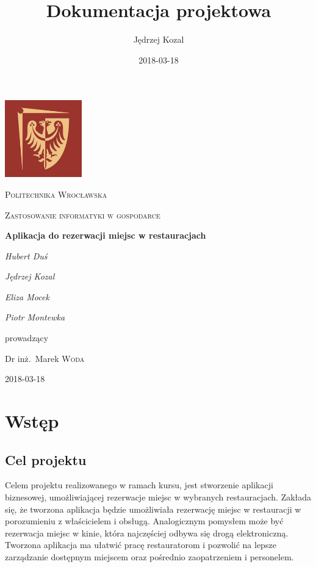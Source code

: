 \documentclass{article}
\title{Dokumentacja projektowa}
\date{2018-03-18}
\author{Jędrzej Kozal}
\begin{document}
\begin{titlepage}
	\centering
	\includegraphics[width=0.25\textwidth]{logo_pol_wroclaw.png}\par\vspace{1cm}
	{\scshape\LARGE Politechnika Wrocławska \par}
	\vspace{1cm}
	{\scshape\Large Zastosowanie informatyki w gospodarce\par}
	\vspace{1.5cm}
	{\huge\bfseries Aplikacja do rezerwacji miejsc w restauracjach \par}
	\vspace{2cm}
	{\Large\itshape Hubert Duś\par}
	{\Large\itshape Jędrzej Kozal\par}
	{\Large\itshape Eliza Mocek\par}
	{\Large\itshape Piotr Montewka\par}

	\vfill
	prowadzący\par
	Dr inż.~Marek \textsc{Woda}

	\vfill

	{\large 2018-03-18\par}
\end{titlepage}


\section{Wstęp}

\subsection{Cel projektu}
Celem projektu realizowanego w ramach kursu, jest stworzenie aplikacji biznesowej, umożliwiającej rezerwacje miejsc w wybranych restauracjach. Zakłada się, że tworzona aplikacja będzie umożliwiała rezerwację miejsc w restauracji w porozumieniu z właścicielem i obsługą. Analogicznym pomysłem może być rezerwacja miejsc w kinie, która najczęściej odbywa się drogą elektroniczną. Tworzona aplikacja ma ułatwić pracę restauratorom i pozwolić na lepsze zarządzanie dostępnym miejscem oraz pośrednio zaopatrzeniem i personelem.
\end{document}
